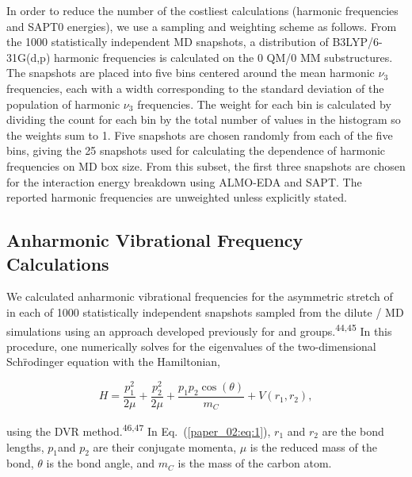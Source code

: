 In order to reduce the number of the costliest calculations (harmonic frequencies and SAPT0 energies), we use a sampling and weighting scheme as follows. From the \num{1000} statistically independent MD snapshots, a distribution of B3LYP/6-31G(d,p) harmonic frequencies is calculated on the 0 QM/0 MM substructures. The snapshots are placed into five bins centered around the mean harmonic \(\nu_{3}\) frequencies, each with a width corresponding to the standard deviation of the population of harmonic \(\nu_{3}\) frequencies. The weight for each bin is calculated by dividing the count for each bin by the total number of values in the histogram so the weights sum to \num{1}. Five snapshots are chosen randomly from each of the five bins, giving the \num{25} snapshots used for calculating the dependence of harmonic frequencies on MD box size. From this subset, the first three snapshots are chosen for the interaction energy breakdown using ALMO-EDA and SAPT. The reported harmonic frequencies are unweighted unless explicitly stated.

\subsection{Anharmonic Vibrational Frequency Calculations}
\label{paper_02:ssec:IIB}

We calculated anharmonic vibrational frequencies for the asymmetric stretch of  in each of \num{1000} statistically independent snapshots sampled from the dilute /\ce{[C4C1im][PF6]} MD simulations using an approach developed previously for  and  groups.\textsuperscript{44,45} In this procedure, one numerically solves for the eigenvalues of the two-dimensional Schr\"{}odinger equation with the Hamiltonian,

\begin{equation}
  \label{paper_02:eq:1}
H = \frac{p_{1}^{2}}{2\mu} + \frac{p_{2}^{2}}{2\mu} + \frac{p_{1}p_{2}\cos{(\theta)}}{m_{C}} + V\left( r_{1},r_{2} \right),
\end{equation}


using the DVR method.\textsuperscript{46,47} In Eq.~(\ref{paper_02:eq:1}), \(r_{1}\) and \(r_{2}\) are the  bond lengths, \(p_{1}\)and \(p_{2}\) are their conjugate momenta, \(\mu\) is the reduced mass of the  bond, \(\theta\) is the  bond angle, and \(m_C\) is the mass of the carbon atom.

